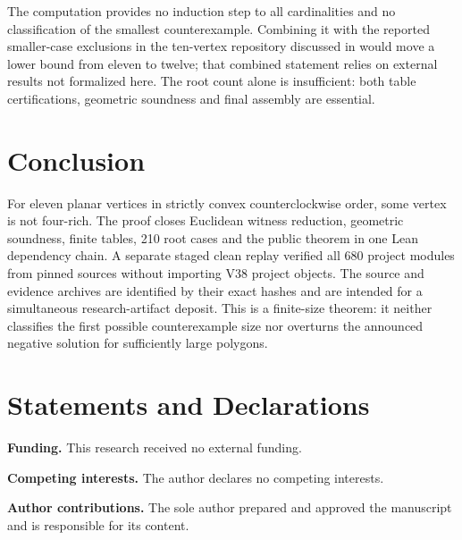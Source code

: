 \documentclass[11pt,a4paper]{article}
\theoremstyle{definition}
\begin{document}
The computation provides no induction step to all cardinalities and no classification of the smallest counterexample. Combining it with the reported smaller-case exclusions in the ten-vertex repository discussed in  would move a lower bound from eleven to twelve; that combined statement relies on external results not formalized here. The root count alone is insufficient: both table certifications, geometric soundness and final assembly are essential.



\section{Conclusion}
For eleven planar vertices in strictly convex counterclockwise order, some vertex is not four-rich. The proof closes Euclidean witness reduction, geometric soundness, finite tables, 210 root cases and the public theorem in one Lean dependency chain. A separate staged clean replay verified all 680 project modules from pinned sources without importing V38 project objects. The source and evidence archives are identified by their exact hashes and are intended for a simultaneous research-artifact deposit. This is a finite-size theorem: it neither classifies the first possible counterexample size nor overturns the announced negative solution for sufficiently large polygons.

\section*{Statements and Declarations}
\noindent\textbf{Funding.} This research received no external funding.

\medskip
\noindent\textbf{Competing interests.} The author declares no competing interests.

\medskip
\noindent\textbf{Author contributions.} The sole author prepared and approved the manuscript and is responsible for its content.
\end{document}
